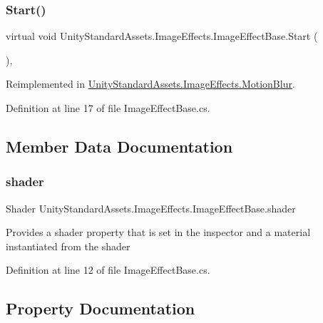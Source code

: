 \subsubsection{\texorpdfstring{Start()}{Start()}}
{\footnotesize\ttfamily virtual void Unity\+Standard\+Assets.\+Image\+Effects.\+Image\+Effect\+Base.\+Start (\begin{DoxyParamCaption}{ }\end{DoxyParamCaption})\hspace{0.3cm}{\ttfamily [protected]}, {\ttfamily [virtual]}}



Reimplemented in \mbox{\hyperlink{class_unity_standard_assets_1_1_image_effects_1_1_motion_blur_a70794816583f9b26550755153bdb85c3}{Unity\+Standard\+Assets.\+Image\+Effects.\+Motion\+Blur}}.



Definition at line 17 of file Image\+Effect\+Base.\+cs.



\subsection{Member Data Documentation}
\mbox{\label{class_unity_standard_assets_1_1_image_effects_1_1_image_effect_base_a8e9767f9fb7f9d66c187173cedfb5ccf}} 
\subsubsection{\texorpdfstring{shader}{shader}}
{\footnotesize\ttfamily Shader Unity\+Standard\+Assets.\+Image\+Effects.\+Image\+Effect\+Base.\+shader}

Provides a shader property that is set in the inspector and a material instantiated from the shader 

Definition at line 12 of file Image\+Effect\+Base.\+cs.



\subsection{Property Documentation}
\mbox{\label{class_unity_standard_assets_1_1_image_effects_1_1_image_effect_base_a01be32995d707d066c79abd94e5089c2}} 
